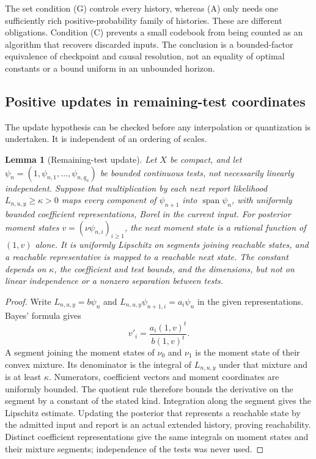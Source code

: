 \documentclass[11pt]{amsart}
\newtheorem{lemma}[theorem]{Lemma}
\theoremstyle{definition}\newtheorem{definition}[theorem]{Definition}
\theoremstyle{remark}\newtheorem{remark}[theorem]{Remark}
\begin{document}
The set condition (G) controls every history, whereas (A) only needs
one sufficiently rich positive-probability family of histories. These
are different obligations. Condition (C) prevents a small codebook from
being counted as an algorithm that recovers discarded inputs. The
conclusion is a bounded-factor equivalence of checkpoint and causal
resolution, not an equality of optimal constants or a bound uniform in
an unbounded horizon.

\subsection{Positive updates in remaining-test coordinates}
The update hypothesis can be checked before any interpolation or
quantization is undertaken. It is independent of an ordering of scales.

\begin{lemma}[Remaining-test update]
\label{lem:positive-remaining-update}
Let $X$ be compact, and let
$\psi_n=(1,\psi_{n,1},\ldots,\psi_{n,q_n})$ be bounded continuous
tests, not necessarily linearly independent. Suppose that multiplication
by each next report likelihood $L_{n,u,y}\ge\kappa>0$ maps every
component of $\psi_{n+1}$ into $\operatorname{span}\psi_n$, with
uniformly bounded coefficient representations, Borel in the current
input. For posterior moment
states $v=(\nu\psi_{n,i})_{i\ge1}$, the next moment state is a
rational function of $(1,v)$ alone. It is uniformly Lipschitz on
segments joining reachable states, and a reachable representative is
mapped to a reachable next state. The constant depends on $\kappa$,
the coefficient and test bounds, and the dimensions, but not on linear
independence or a nonzero separation between tests.
\end{lemma}
\begin{proof}
Write $L_{n,u,y}=b\psi_n$ and
$L_{n,u,y}\psi_{n+1,i}=a_i\psi_n$ in the given representations.
Bayes' formula gives
\[
 v'_i=\frac{a_i(1,v)^t}{b(1,v)^t}.
\]
A segment joining the moment states of $\nu_0$ and $\nu_1$ is the
moment state of their convex mixture. Its denominator is the integral
of $L_{n,u,y}$ under that mixture and is at least $\kappa$.
Numerators, coefficient vectors and moment coordinates are uniformly
bounded. The quotient rule therefore bounds the derivative on the
segment by a constant of the stated kind. Integration along the
segment gives the Lipschitz estimate. Updating the posterior that
represents a reachable state by the admitted input and report is an
actual extended history, proving reachability. Distinct coefficient
representations give the same integrals on moment states and their
mixture segments; independence of the tests was never used.
\end{proof}
\end{document}
